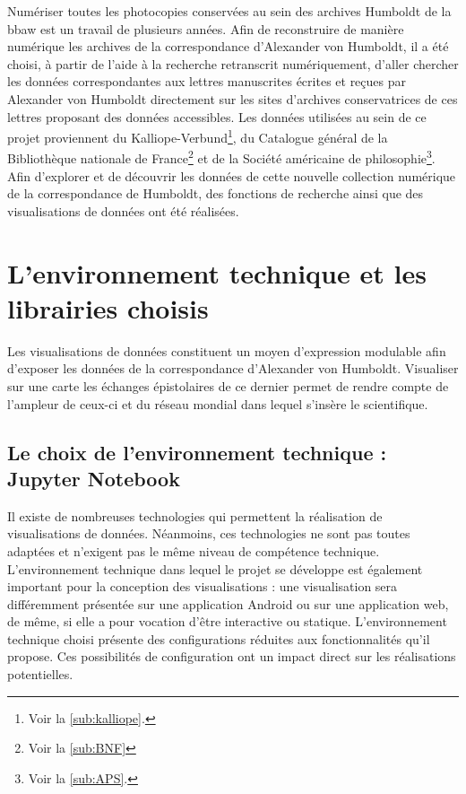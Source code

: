 \documentclass[a4paper, 12pt, twoside]{book}
\begin{document}
Numériser toutes les photocopies conservées au sein des archives Humboldt de la \gls{bbaw} est un travail de plusieurs années. Afin de reconstruire de manière numérique les archives de la correspondance d'Alexander von Humboldt, il a été choisi, à partir de l'aide à la recherche retranscrit numériquement, d'aller chercher les données correspondantes aux lettres manuscrites écrites et reçues par Alexander von Humboldt directement sur les sites d'archives conservatrices de ces lettres proposant des données accessibles. 
Les données utilisées au sein de ce projet proviennent du Kalliope-Verbund\footnote{Voir la \autoref{sub:kalliope}.}, du Catalogue général de la Bibliothèque nationale de France\footnote{Voir la \autoref{sub:BNF}} et de la Société américaine de philosophie\footnote{Voir la \autoref{sub:APS}.}. Afin d'explorer et de découvrir les données de cette nouvelle collection numérique de la correspondance de Humboldt, des fonctions de recherche ainsi que des visualisations de données ont été réalisées.

\section{L'environnement technique et les librairies choisis}
Les visualisations de données constituent un moyen d'expression modulable afin d'exposer les données de la correspondance d'Alexander von Humboldt. Visualiser sur une carte les échanges épistolaires de ce dernier permet de rendre compte de l'ampleur de ceux-ci et du réseau mondial dans lequel s'insère le scientifique.

\subsection{Le choix de l'environnement technique : Jupyter Notebook}
Il existe de nombreuses technologies qui permettent la réalisation de visualisations de données. Néanmoins, ces technologies ne sont pas toutes adaptées et n'exigent pas le même niveau de compétence technique. L'environnement technique dans lequel le projet se développe est également important pour la conception des visualisations : une visualisation sera différemment présentée sur une application Android ou sur une application web, de même, si elle a pour vocation d'être interactive ou statique. L'environnement technique choisi présente des configurations réduites aux fonctionnalités qu'il propose. Ces possibilités de configuration ont un impact direct sur les réalisations potentielles. 
\end{document}
